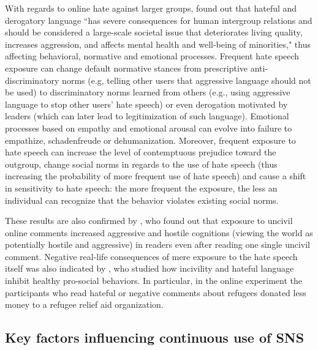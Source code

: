 \documentclass[a4paper,fleqn]{cas-dc}
\begin{document}
With regards to online hate against larger groups, 
\citet{bilewicz2020hate} found out that hateful and derogatory language ``has severe consequences for human intergroup relations and should be considered a large-scale societal issue that deteriorates living quality, increases aggression, and affects mental health and well-being of minorities," thus affecting behavioral, normative and emotional processes.  Frequent hate speech exposure can change default normative stances from prescriptive anti-discriminatory norms (e.g, telling other users that aggressive language should not be used) to  discriminatory norms learned from others  (e.g., using aggressive language to stop other users' hate speech) or even derogation motivated by leaders (which can later lead to legitimization of such language). Emotional processes based on empathy and emotional arousal can evolve into failure to empathize, schadenfreude or dehumanization. 
Moreover, frequent exposure to hate speech can increase the level of contemptuous prejudice toward the outgroup, change social norms in regards to the use of hate speech (thus increasing the probability of more frequent use of hate speech) and cause a shift in sensitivity to hate speech: the more frequent the exposure, the less an individual can recognize that the behavior violates existing social norms.


These results are also confirmed by \citet{rosner2016dangerous}, who found out that exposure to uncivil online comments increased aggressive and hostile cognitions (viewing the world as potentially hostile and aggressive) in readers even after reading one single uncivil comment. 
Negative real-life consequences of mere exposure to the hate speech itself was also indicated by \citet{weber2020online}, who studied how incivility and hateful language inhibit healthy pro-social behaviors. In particular, in the online experiment the participants who read hateful or negative comments about refugees donated less money to 
a refugee relief aid organization. 

























\subsection{Key factors  influencing continuous use of SNS}
\end{document}
